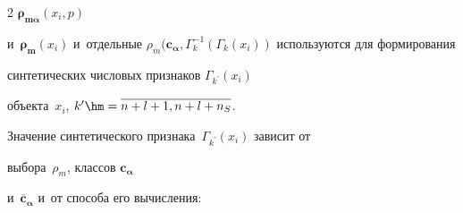 \begin{multicols}{2}
$\bm{\rho}_{\mathbf{m}{\overline{\bm \alpha}}}(x_i, {p})$ 

и~$\bm{\rho}_{\mathbf{m}}(x_i)$ и~отдельные $\rho_m(\mathbf{c}_{\bm 

\alpha}, \Gamma_k^{-1}(\Gamma_k(x_i))$ используются для формирования 

синтетических числовых признаков $\Gamma_{k^\prime}(x_i)$ 

объекта~$x_i$, $k^\prime\hm= \overline{n+ l+1, n+l+n_S}$. 

Значение синтетического признака~$\Gamma_{k^\prime}(x_i)$ зависит от 

выбора~$\rho_m$, классов $\mathbf{c}_{\bm{\alpha}}$ 

и~$\overline{\mathbf{c}}_{\bm{\alpha}}$  и~от способа его вы\-чис\-ле\-ния: 

\end{multicols}
